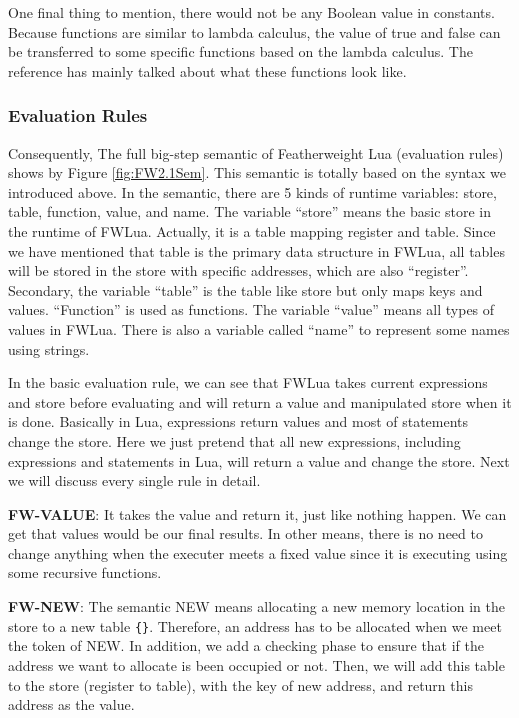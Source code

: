 \documentclass{article}
\begin{document}
One final thing to mention, there would not be any Boolean value in constants. Because functions are similar to lambda calculus, the value of true and false can be transferred to some specific functions based on the lambda calculus. The reference\cite{LC} has mainly talked about what these functions look like.


\subsubsection{Evaluation Rules}\label{sec: FWLUAsemantic}
Consequently, The full big-step semantic of Featherweight Lua (evaluation rules) shows by Figure \ref{fig:FW2.1Sem}. This semantic is totally based on the syntax we introduced above. In the semantic, there are 5 kinds of runtime variables: store, table, function, value, and name. The variable ``store'' means the basic store in the runtime of FWLua. Actually, it is a table mapping register and table. Since we have mentioned that table is the primary data structure in FWLua, all tables will be stored in the store with specific addresses, which are also ``register''. Secondary, the variable ``table'' is the table like store but only maps keys and values. ``Function'' is used as functions. The variable ``value'' means all types of values in FWLua. There is also a variable called ``name'' to represent some names using strings.

In the basic evaluation rule, we can see that FWLua takes current expressions and store before evaluating and will return a value and manipulated store when it is done. Basically in Lua, expressions return values and most of statements change the store. Here we just pretend that all new expressions, including expressions and statements in Lua, will return a value and change the store. Next we will discuss every single rule in detail.

{\bf FW-VALUE}: It takes the value and return it, just like nothing happen. We can get that values would be our final results. In other means, there is no need to change anything when the executer meets a fixed value since it is executing using some recursive functions. 

{\bf FW-NEW}: The semantic NEW means allocating a new memory location in the store to a new table {\tt \{\}}. Therefore, an address has to be allocated when we meet the token of NEW. In addition, we add a checking phase to ensure that if the address we want to allocate is been occupied or not. Then, we will add this table to the store (register to table), with the key of new address, and return this address as the value.
\end{document}
